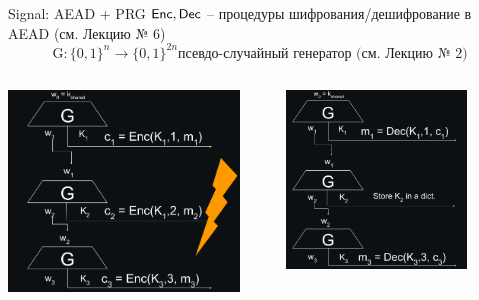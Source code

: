 \documentclass[usenames,dvipsnames,8pt,aspectratio=169]{beamer}
\begin{document}
\begin{frame}{Signal: AEAD + PRG}
\Large 
$\textsf{Enc}, \textsf{Dec}$ -- процедуры шифрования/дешифрование в AEAD (см. Лекцию № 6)
\[
\text{G}: \{0,1\}^n \rightarrow \{0,1\}^{2n} \text{псевдо-случайный генератор (см. Лекцию № 2)}
\]
\vspace{-20pt}
\begin{columns}[T]
	\hspace{-30pt}
	\begin{column}{0.5\textwidth}
		\centering
		\includegraphics[width=0.9\textwidth]{SendSignalNoC2}
	\end{column}
	\hspace{-70pt}
	\begin{column}{0.5\textwidth}
		\centering
		\pause 
		\includegraphics[width=0.80\textwidth]{ReceiveSignalNoC2}
	\end{column}
\end{columns}
\centering
\vspace{10pt}
\end{frame}
\end{document}
